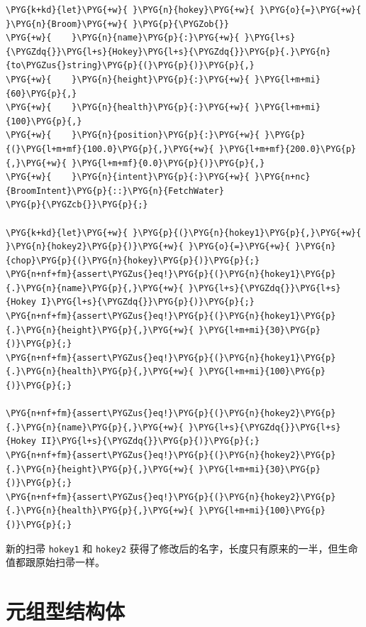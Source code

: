 \begin{Verbatim}[commandchars=\\\{\},breaklines=true,breakanywhere=true,fontsize=\codefont,xleftmargin=17bp]
\PYG{k+kd}{let}\PYG{+w}{ }\PYG{n}{hokey}\PYG{+w}{ }\PYG{o}{=}\PYG{+w}{ }\PYG{n}{Broom}\PYG{+w}{ }\PYG{p}{\PYGZob{}}
\PYG{+w}{    }\PYG{n}{name}\PYG{p}{:}\PYG{+w}{ }\PYG{l+s}{\PYGZdq{}}\PYG{l+s}{Hokey}\PYG{l+s}{\PYGZdq{}}\PYG{p}{.}\PYG{n}{to\PYGZus{}string}\PYG{p}{(}\PYG{p}{)}\PYG{p}{,}
\PYG{+w}{    }\PYG{n}{height}\PYG{p}{:}\PYG{+w}{ }\PYG{l+m+mi}{60}\PYG{p}{,}
\PYG{+w}{    }\PYG{n}{health}\PYG{p}{:}\PYG{+w}{ }\PYG{l+m+mi}{100}\PYG{p}{,}
\PYG{+w}{    }\PYG{n}{position}\PYG{p}{:}\PYG{+w}{ }\PYG{p}{(}\PYG{l+m+mf}{100.0}\PYG{p}{,}\PYG{+w}{ }\PYG{l+m+mf}{200.0}\PYG{p}{,}\PYG{+w}{ }\PYG{l+m+mf}{0.0}\PYG{p}{)}\PYG{p}{,}
\PYG{+w}{    }\PYG{n}{intent}\PYG{p}{:}\PYG{+w}{ }\PYG{n+nc}{BroomIntent}\PYG{p}{::}\PYG{n}{FetchWater}
\PYG{p}{\PYGZcb{}}\PYG{p}{;}

\PYG{k+kd}{let}\PYG{+w}{ }\PYG{p}{(}\PYG{n}{hokey1}\PYG{p}{,}\PYG{+w}{ }\PYG{n}{hokey2}\PYG{p}{)}\PYG{+w}{ }\PYG{o}{=}\PYG{+w}{ }\PYG{n}{chop}\PYG{p}{(}\PYG{n}{hokey}\PYG{p}{)}\PYG{p}{;}
\PYG{n+nf+fm}{assert\PYGZus{}eq!}\PYG{p}{(}\PYG{n}{hokey1}\PYG{p}{.}\PYG{n}{name}\PYG{p}{,}\PYG{+w}{ }\PYG{l+s}{\PYGZdq{}}\PYG{l+s}{Hokey I}\PYG{l+s}{\PYGZdq{}}\PYG{p}{)}\PYG{p}{;}
\PYG{n+nf+fm}{assert\PYGZus{}eq!}\PYG{p}{(}\PYG{n}{hokey1}\PYG{p}{.}\PYG{n}{height}\PYG{p}{,}\PYG{+w}{ }\PYG{l+m+mi}{30}\PYG{p}{)}\PYG{p}{;}
\PYG{n+nf+fm}{assert\PYGZus{}eq!}\PYG{p}{(}\PYG{n}{hokey1}\PYG{p}{.}\PYG{n}{health}\PYG{p}{,}\PYG{+w}{ }\PYG{l+m+mi}{100}\PYG{p}{)}\PYG{p}{;}

\PYG{n+nf+fm}{assert\PYGZus{}eq!}\PYG{p}{(}\PYG{n}{hokey2}\PYG{p}{.}\PYG{n}{name}\PYG{p}{,}\PYG{+w}{ }\PYG{l+s}{\PYGZdq{}}\PYG{l+s}{Hokey II}\PYG{l+s}{\PYGZdq{}}\PYG{p}{)}\PYG{p}{;}
\PYG{n+nf+fm}{assert\PYGZus{}eq!}\PYG{p}{(}\PYG{n}{hokey2}\PYG{p}{.}\PYG{n}{height}\PYG{p}{,}\PYG{+w}{ }\PYG{l+m+mi}{30}\PYG{p}{)}\PYG{p}{;}
\PYG{n+nf+fm}{assert\PYGZus{}eq!}\PYG{p}{(}\PYG{n}{hokey2}\PYG{p}{.}\PYG{n}{health}\PYG{p}{,}\PYG{+w}{ }\PYG{l+m+mi}{100}\PYG{p}{)}\PYG{p}{;}
\end{Verbatim}

新的扫帚 \texttt{hokey1} 和 \texttt{hokey2} 获得了修改后的名字，长度只有原来的一半，但生命值都跟原始扫帚一样。

\section{元组型结构体}

